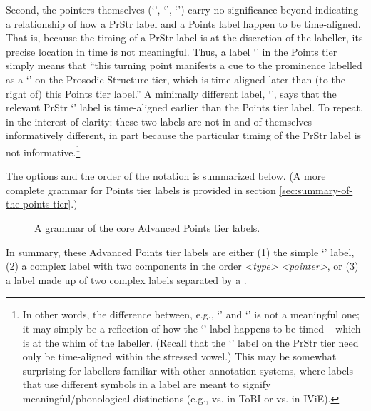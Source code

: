 Second, the pointers themselves (‘\textlabel{>}’, ‘\textlabel{<}’, ‘’) carry no significance beyond indicating a relationship of how a PrStr label and a Points label happen to be time-aligned. That is, because the timing of a PrStr label is at the discretion of the labeller, its precise location in time is not meaningful.  Thus, a label ‘\textlabel{*>}’ in the Points tier simply means that “this turning point manifests a cue to the prominence labelled as a ‘\textlabel{*}’ on the Prosodic Structure tier, which is time-aligned later than (to the right of) this Points tier label.” A minimally different label, ‘\textlabel{*<}’, says that the relevant PrStr ‘\textlabel{*}’ label is time-aligned earlier than the Points tier label. To repeat, in the interest of clarity: these two labels are not in and of themselves informatively different, in part because the particular timing of the PrStr label is not informative.\footnote{In other words, the difference between, e.g., ‘\textlabel{*>}’ and ‘\textlabel{*<}’ is not a meaningful one; it may simply be a reflection of how the ‘\textlabel{*}’ label happens to be timed – which is at the whim of the labeller. (Recall that the ‘\textlabel{*}’ label on the PrStr tier need only be time-aligned within the stressed vowel.) This may be somewhat surprising for labellers familiar with other annotation systems, where labels that use different symbols in a label are meant to signify meaningful\slash phonological distinctions (e.g.,  vs.  in ToBI or  vs.  in IViE).}

The options and the order of the notation is summarized below. (A more complete grammar for Points tier labels is provided in section \ref{sec:summary-of-the-points-tier}.)

\begin{figure}[H]
\centering
%

%
\caption{A grammar of the core Advanced Points tier labels.%
\label{fig:Points FSG basic}%
}
\end{figure}

In summary, these Advanced Points tier labels are either (1) the simple ‘’ label, (2) a complex label with two components in the order \textit{<{type}>{}} \textit{<{pointer}>}, or (3) a label made up of two complex labels separated by a \textlabel{/}.

